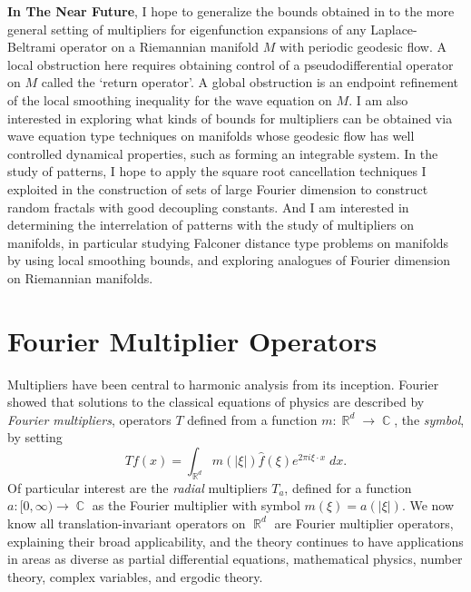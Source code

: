 \documentclass[12pt]{article}
\DeclareMathOperator{\RR}{\mathbb{R}}
\DeclareMathOperator{\CC}{\mathbb{C}}
\begin{document}

{\bf In The Near Future}, I hope to generalize the bounds obtained in \cite{DensonCharacterization} to the more general setting of multipliers for eigenfunction expansions of any Laplace-Beltrami operator on a Riemannian manifold $M$ with periodic geodesic flow. A local obstruction here requires obtaining control of a pseudodifferential operator on $M$ called the `return operator'. A global obstruction is an endpoint refinement of the local smoothing inequality for the wave equation on $M$. %
I am also interested in exploring what kinds of bounds for multipliers can be obtained via wave equation type techniques on manifolds whose geodesic flow has well controlled dynamical properties, such as forming an integrable system. In the study of patterns, I hope to apply the square root cancellation techniques I exploited in the construction of sets of large Fourier dimension to construct random fractals with good decoupling constants. And I am interested in determining the interrelation of patterns with the study of multipliers on manifolds, in particular studying Falconer distance type problems on manifolds by using local smoothing bounds, and exploring analogues of Fourier dimension on Riemannian manifolds.

\pagebreak[3]






\section*{Fourier Multiplier Operators}


Multipliers have been central to harmonic analysis from its inception. Fourier showed that solutions to the classical equations of physics are described by \emph{Fourier multipliers}, operators $T$ defined from a function $m: \RR^d \to \CC$, the \emph{symbol}, by setting
%
\[ Tf(x) = \int_{\RR^d} m(|\xi|) \widehat{f}(\xi) e^{2 \pi i \xi \cdot x}\; dx. \]
%
Of particular interest are the \emph{radial} multipliers $T_a$, defined for a function $a: [0,\infty) \to \CC$ as the Fourier multiplier with symbol $m(\xi) = a(|\xi|)$. We now know all translation-invariant operators on $\RR^d$ are Fourier multiplier operators, explaining their broad applicability, and the theory continues to have applications in areas as diverse as partial differential equations, mathematical physics, number theory, complex variables, and ergodic theory.
\end{document}
